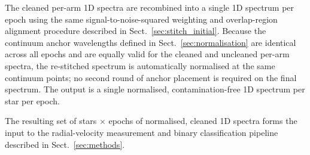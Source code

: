 The cleaned per-arm 1D spectra are recombined into a single 1D
spectrum per epoch using the same signal-to-noise-squared weighting
and overlap-region alignment procedure described in
Sect.~\ref{sec:stitch_initial}. Because the continuum anchor wavelengths
defined in Sect.~\ref{sec:normalisation} are identical across all epochs
and are equally valid for the cleaned and uncleaned per-arm spectra,
the re-stitched spectrum is automatically normalised at the same
continuum points; no second round of anchor placement is required on
the final spectrum. The output is a single normalised, contamination-free
1D spectrum per star per epoch.

The resulting set of \Ntotal stars $\times$ \Nepochs epochs of normalised,
cleaned 1D spectra forms the input to the radial-velocity measurement
and binary classification pipeline described in Sect.~\ref{sec:methods}.

